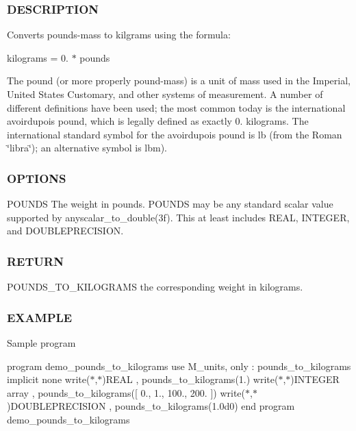 \subsubsection*{D\+E\+S\+C\+R\+I\+P\+T\+I\+ON}

Converts pounds-\/mass to kilgrams using the formula\+:

kilograms = 0. $\ast$ pounds

The pound (or more properly pound-\/mass) is a unit of mass used in the Imperial, United States Customary, and other systems of measurement. A number of different definitions have been used; the most common today is the international avoirdupois pound, which is legally defined as exactly 0. kilograms. The international standard symbol for the avoirdupois pound is lb (from the Roman \char`\"{}libra\char`\"{}); an alternative symbol is lbm).

\subsubsection*{O\+P\+T\+I\+O\+NS}

P\+O\+U\+N\+DS The weight in pounds. P\+O\+U\+N\+DS may be any standard scalar value supported by anyscalar\+\_\+to\+\_\+double(3f). This at least includes R\+E\+AL, I\+N\+T\+E\+G\+ER, and D\+O\+U\+B\+L\+E\+P\+R\+E\+C\+I\+S\+I\+ON. \subsubsection*{R\+E\+T\+U\+RN}

P\+O\+U\+N\+D\+S\+\_\+\+T\+O\+\_\+\+K\+I\+L\+O\+G\+R\+A\+MS the corresponding weight in kilograms. \subsubsection*{E\+X\+A\+M\+P\+LE}

Sample program

program demo\+\_\+pounds\+\_\+to\+\_\+kilograms use M\+\_\+units, only \+: pounds\+\_\+to\+\_\+kilograms implicit none write($\ast$,$\ast$)\textquotesingle{}R\+E\+AL \textquotesingle{}, pounds\+\_\+to\+\_\+kilograms(1.) write($\ast$,$\ast$)\textquotesingle{}I\+N\+T\+E\+G\+ER array \textquotesingle{}, pounds\+\_\+to\+\_\+kilograms(\mbox{[} 0., 1., 100., 200. \mbox{]}) write($\ast$,$\ast$)\textquotesingle{}D\+O\+U\+B\+L\+E\+P\+R\+E\+C\+I\+S\+I\+ON \textquotesingle{}, pounds\+\_\+to\+\_\+kilograms(1.\+0d0) end program demo\+\_\+pounds\+\_\+to\+\_\+kilograms

